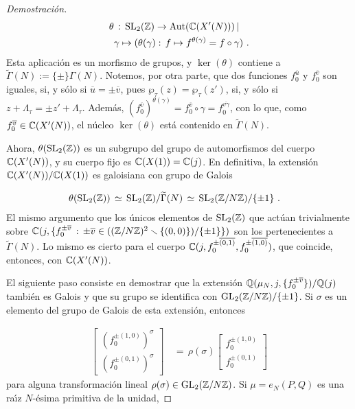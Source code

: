 \begin{proof}[Demostraci\'{o}n]
\begin{align*}
\theta & \,:\,\mathrm{SL}_{2}(\mathbb{Z})\rightarrow\mathrm{Aut}(\mathbb{C}(X'(N)))\,|\\
 & \gamma\mapsto(
\theta(\gamma):\,f\mapsto f^{\theta(\gamma)}=f\circ\gamma)\text{ .}
\end{align*}
Esta aplicaci\'{o}n es un morfismo de grupos, y $\ker(\theta)$ contiene a
$\widetilde{\Gamma}(N):=\{\pm\}\Gamma(N)$. Notemos, por otra parte, que dos
funciones $f_{0}^{\overline{u}}$ y $f_{0}^{\overline{v}}$ son iguales, si, y
s\'{o}lo si $\overline{u}=\pm\overline{v}$, pues $\wp_{\tau}(z)=\wp_{\tau}(z')$,
si, y s\'{o}lo si $z+\Lambda_{\tau}=\pm z'+\Lambda_{\tau}$. Adem\'{a}s,
\begin{math}
(f_{0}^{\overline{v}})^{\theta(\gamma)}=
f_{0}^{\overline{v}}\circ\gamma=f_{0}^{\overline{v\gamma}}
\end{math},
con lo que, como $f_{0}^{\overline{v}}\in\mathbb{C}(X'(N))$, el n\'{u}cleo
$\ker(\theta)$ est\'{a} contenido en $\widetilde{\Gamma}(N)$.

Ahora, $\theta(\mathrm{SL}_{2}(\mathbb{Z}))$ es un subgrupo del grupo de automorfismos del
cuerpo $\mathbb{C}(X'(N))$, y su cuerpo fijo es $\mathbb{C}(X(1))=\mathbb{C}(j)$. En
definitiva, la extensi\'{o}n $\mathbb{C}(X'(N))/\mathbb{C}(X(1))$ es galoisiana con
grupo de Galois

\begin{align*}
\theta(\mathrm{SL}_{2}(\mathbb{Z}))& \,\simeq\,\mathrm{SL}_{2}(\mathbb{Z})/\widetilde{\Gamma}(N)
\,\simeq\,\mathrm{SL}_{2}(\mathbb{Z}/N\mathbb{Z})/\{\pm 1\}\text{ .}
\end{align*}
El mismo argumento que los \'{u}nicos elementos de $\mathrm{SL}_{2}(\mathbb{Z})$ que act\'{u}an
trivialmente sobre
\begin{math}
\mathbb{C}(j,\{f_{0}^{\pm\overline{v}}\,:\,
\pm\overline{v}\in((\mathbb{Z}/N\mathbb{Z})^{2}\smallsetminus\{(0,0)\})/\{\pm 1\}\})
\end{math}
son los pertenecientes a $\widetilde{\Gamma}(N)$. Lo mismo es cierto para el
cuerpo $\mathbb{C}(j,f_{0}^{\pm\overline{(0,1)}},f_{0}^{\pm\overline{(1,0)}})$, que
coincide, entonces, con $\mathbb{C}(X'(N))$.

El siguiente paso consiste en demostrar que la extensi\'{o}n
$\mathbb{Q}(\mu_{N},j,\{f_{0}^{\pm\overline{v}}\})/\mathbb{Q}(j)$ tambi\'{e}n es Galois y
que su grupo se identifica con $\mathrm{GL}_{2}(\mathbb{Z}/N\mathbb{Z})/\{\pm 1\}$. Si $\sigma$ es
un elemento del grupo de Galois de esta extensi\'{o}n, entonces

\begin{align*}
 \begin{bmatrix}
  (f_{0}^{\pm(1,0)})^{\sigma}\\
  (f_{0}^{\pm(0,1)})^{\sigma}
 \end{bmatrix} & \,=\,\rho(\sigma)
 \begin{bmatrix} f_{0}^{\pm(1,0)}\\f_{0}^{\pm(0,1)} \end{bmatrix}
\end{align*}
para alguna transformaci\'{o}n lineal $\rho(\sigma)\in\mathrm{GL}_{2}(\mathbb{Z}/N\mathbb{Z})$.
Si $\mu=e_{N}(P,Q)$ es una ra\'{\i}z $N$-\'{e}sima primitiva de la unidad,


\end{proof}
